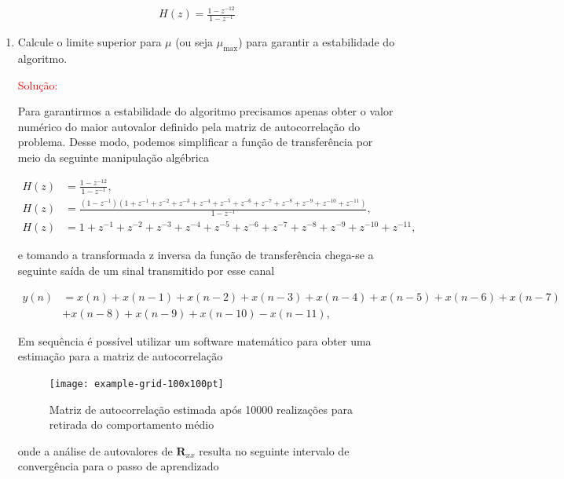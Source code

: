     
\begin{align}
    H(z) = \frac{1 - z^{-12}}{1 - z^{-1}}
\end{align}

\begin{enumerate}

    \item Calcule o limite superior para $\mu$ (ou seja $\mu_{\text{max}}$) para garantir a estabilidade do algoritmo.

        \textcolor{red}{Solução:}

        Para garantirmos a estabilidade do algoritmo precisamos apenas obter o valor numérico do maior autovalor definido pela matriz de autocorrelação do problema.
        Desse modo, podemos simplificar a função de transferência por meio da seguinte manipulação algébrica

        \begin{align*}
            H(z) &= \frac{1 - z^{-12}}{1 - z^{-1}}, \\
            H(z) &= \frac{(1 - z^{-1})(1 + z^{-1} + z^{-2} + z^{-3} + z^{-4} + z^{-5} + z^{-6} + z^{-7} + z^{-8} + z^{-9} + z^{-10} + z^{-11})}{1 - z^{-1}}, \\
            H(z) &= 1 + z^{-1} + z^{-2} + z^{-3} + z^{-4} + z^{-5} + z^{-6} + z^{-7} + z^{-8} + z^{-9} + z^{-10} + z^{-11},
        \end{align*}

        e tomando a transformada z inversa da função de transferência chega-se a seguinte saída de um sinal transmitido por esse canal

        \begin{align*}
            y(n) &= x(n) + x(n-1) + x(n-2) + x(n-3) + x(n-4) + x(n-5) + x(n-6) + x(n-7) \\
            &+ x(n-8) + x(n-9) + x(n-10) - x(n-11), 
        \end{align*}

        Em sequência é possível utilizar um software matemático para obter uma estimação para a matriz de autocorrelação

        \begin{figure}[!htp]
            \centering
            \texttt{[image: example-grid-100x100pt]}
        \caption{Matriz de autocorrelação estimada após 10000 realizações para retirada do comportamento médio}
        \label{fig:rxx}
        \end{figure}

        onde a análise de autovalores de $\mathbf{R}_{xx}$ resulta no seguinte intervalo de convergência para o passo de 
        aprendizado


\end{enumerate}
